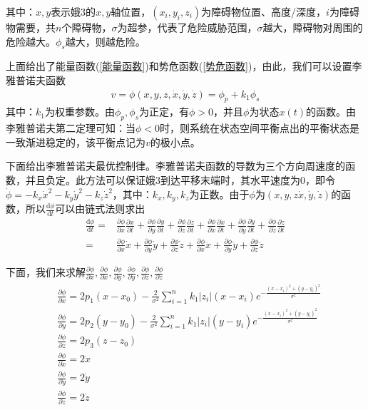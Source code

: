             其中：$x,y$表示娥3的$x,y$轴位置，$(x_i,y_i,z_i)$为障碍物位置、高度/深度，$i$为障碍物需要，共$n$个障碍物，$\sigma$为超参，代表了危险威胁范围，$\sigma$越大，障碍物对周围的危险越大。$\phi_s$越大，则越危险。
            \par
            上面给出了能量函数(\ref{能量函数})和势危函数(\ref{势危函数})，由此，我们可以设置李雅普诺夫函数
            \begin{align*}
            v = \phi(x,y,z,\dot{x},\dot{y},\dot{z}) = \phi_p+k_1\phi_s
            \end{align*}
            其中：$k_1$为权重参数。由$\phi_p,\phi_s$为正定，有$\phi>0$，并且$\phi$为状态$x(t)$的函数。由李雅普诺夫第二定理可知：当$\phi<0$时，则系统在状态空间平衡点出的平衡状态是一致渐进稳定的，该平衡点记为$v$的极小点。
            \par
            下面给出李雅普诺夫最优控制律。李雅普诺夫函数的导数为三个方向周速度的函数，并且负定。此方法可以保证娥3到达平移末端时，其水平速度为0，即令$\dot{\phi} = -k_x\dot{x}^2-k_y\dot{y}^2-k_z\dot{z}^2$，其中：$k_x,k_y,k_z$为正数。由于$\phi$为$(x,y,z\dot{x},\dot{y},\dot{z})$的函数，所以$\frac{\mathrm{d}\phi}{\mathrm{d}t}$可以由链式法则求出
            \begin{align*}
            \frac{\mathrm{d}\phi}{\mathrm{d}t} =&  \frac{\partial \phi}{\partial x}\frac{\partial x}{\partial t}+\frac{\partial \phi}{\partial y}\frac{\partial y}{\partial t}+\frac{\partial \phi}{\partial z}\frac{\partial z}{\partial t}+ \frac{\partial \phi}{\partial \dot{x}}\frac{\partial \dot{x}}{\partial t}+\frac{\partial \phi}{\partial\dot{y}}\frac{\partial \dot{y}}{\partial t}+\frac{\partial \phi}{\partial \dot{z}}\frac{\partial \dot{z}}{\partial t}\\
            =& \frac{\partial \phi}{\partial x}\dot{x}+\frac{\partial \phi}{\partial y}\dot{y}+\frac{\partial \phi}{\partial z}\dot{z}+\frac{\partial \phi}{\partial \dot{x}}\ddot{x}+\frac{\partial \phi}{\partial \dot{y}}\ddot{y}+\frac{\partial \phi}{\partial \dot{z}}\ddot{z}
            \end{align*}
            \par
            下面，我们来求解$\frac{\partial \phi}{\partial x},\frac{\partial \phi}{\partial \dot{x}},\frac{\partial \phi}{\partial y},\frac{\partial \phi}{\partial \dot{y}},\frac{\partial \phi}{\partial z},\frac{\partial \phi}{\partial \dot{z}}$
            \begin{align*}
            & \frac{\partial \phi}{\partial x}  = 2p_1(x-x_0) - \frac{2}{\sigma^2}\sum_{i=1}^n k_1|z_i|(x-x_i) e^{ -\frac{(x-x_i)^2+(y-y_i)^2}{\sigma^2}  }\\
            & \frac{\partial \phi}{\partial y}= 2p_2(y-y_0) - \frac{2}{\sigma^2}\sum_{i=1}^n k_1|z_i|(y-y_i) e^{ -\frac{(x-x_i)^2+(y-y_i)^2}{\sigma^2}  } \\
            & \frac{\partial \phi}{\partial z}= 2p_3(z-z_0) \\
            & \frac{\partial \phi}{\partial \dot{x}} =2\dot{x} \\
            & \frac{\partial \phi}{\partial \dot{y}}=2\dot{y} \\
            & \frac{\partial \phi}{\partial \dot{z}}=2\dot{z}
            \end{align*}
